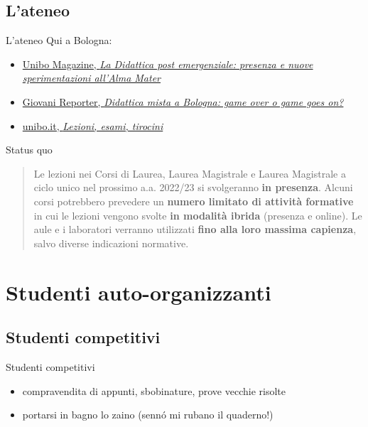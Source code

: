 \documentclass{beamer}
\begin{document}
\subsection{L'ateneo}
\begin{frame}{L'ateneo}
  Qui a Bologna:
  \begin{itemize}
    \item<1-> \href{https://magazine.unibo.it/archivio/2022/06/07/la-didattica-post-emergenziale-presenza-e-nuove-sperimentazioni-all2019alma-mater}{Unibo
      Magazine, \emph{La Didattica post emergenziale: presenza e nuove
      sperimentazioni all’Alma Mater}}
    \item<2-> \href{https://www.giovanireporter.org/2022/08/03/didattica-mista-a-bologna-game-over-o-game-goes-on/}{Giovani Reporter,
      \emph{Didattica mista a Bologna: game over o game goes on?}}
    \item<3-> \href{https://www.unibo.it/it/ateneo/covid-19-misure-adottate-da-alma-mater/lezioni-esami-tirocini}{unibo.it,
      \emph{Lezioni, esami, tirocini}}
  \end{itemize}
\end{frame}

\begin{frame}{Status quo}
  \begin{quote}
    Le lezioni nei Corsi di Laurea, Laurea Magistrale e Laurea Magistrale a
    ciclo unico nel prossimo a.a. 2022/23 si svolgeranno \textbf{in presenza}.
    \pause Alcuni corsi potrebbero prevedere un \textbf{numero limitato di
    attività formative} in cui le lezioni vengono svolte \textbf{in modalità
    ibrida} (presenza e online). \pause Le aule e i laboratori verranno utilizzati \textbf{fino alla loro massima
    capienza}, salvo diverse indicazioni normative.
  \end{quote}
\end{frame}

\section{Studenti auto-organizzanti}

\subsection{Studenti competitivi}
\begin{frame}{Studenti competitivi}
  \begin{itemize}
    \item<1-> compravendita di appunti, sbobinature, prove vecchie risolte
    \item<2-> portarsi in bagno lo zaino (sennó mi rubano il quaderno!)
  \end{itemize}
\end{frame}
\end{document}
